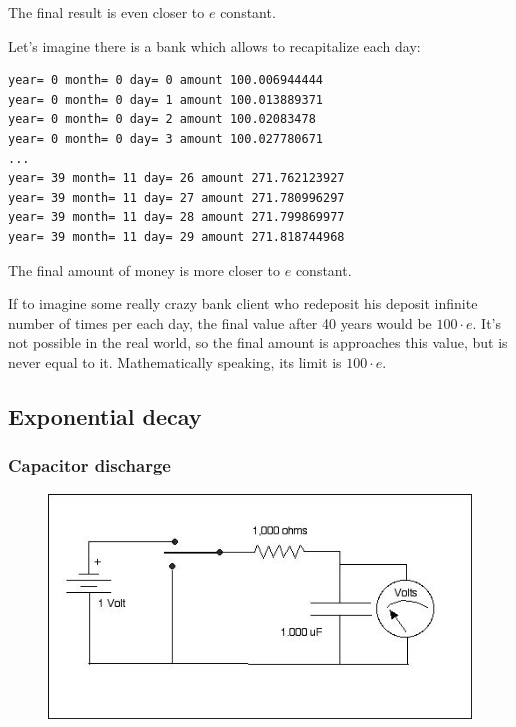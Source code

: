The final result is even closer to $e$ constant.

Let's imagine there is a bank which allows to recapitalize each day:



\begin{lstlisting}
year= 0 month= 0 day= 0 amount 100.006944444
year= 0 month= 0 day= 1 amount 100.013889371
year= 0 month= 0 day= 2 amount 100.02083478
year= 0 month= 0 day= 3 amount 100.027780671
...
year= 39 month= 11 day= 26 amount 271.762123927
year= 39 month= 11 day= 27 amount 271.780996297
year= 39 month= 11 day= 28 amount 271.799869977
year= 39 month= 11 day= 29 amount 271.818744968
\end{lstlisting}

The final amount of money is more closer to $e$ constant.

If to imagine some really crazy bank client who redeposit his deposit infinite number of times per each day, the final value after 40 years
would be $100 \cdot e$.
It's not possible in the real world, so the final amount is approaches this value, but is never equal to it.
Mathematically speaking, its limit is $100 \cdot e$.

\subsection{Exponential decay}

\subsubsection{Capacitor discharge}

\begin{figure}[H]
\centering
\includegraphics[scale=0.66]{log/Schematic_of_Battery_and_Capacitor.jpg}
\end{figure}

